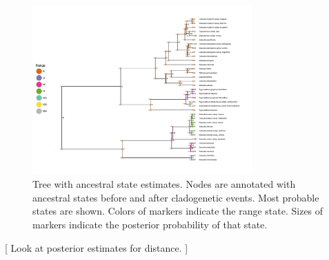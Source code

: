 \begin{figure}[!ht]
\centering
\includegraphics[width=0.75\textwidth]{figures/fig_epoch_RevGadgets_ase.pdf}
\caption{Tree with ancestral state estimates. Nodes are annotated with ancestral states before and after cladogenetic events. Most probable states are shown. Colors of markers indicate the range state. Sizes of markers indicate the posterior probability of that state. }
\label{fig:epoch_RevGadgets_ase}
\end{figure}

[ Look at posterior estimates for distance. ]

\newpage
